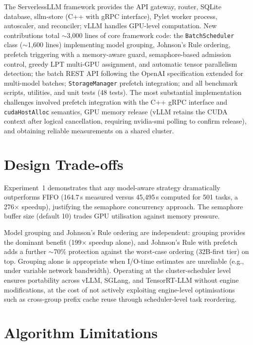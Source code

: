 \documentclass[logo,bsc,singlespacing,parskip,online]{infthesis}
\begin{document}
The ServerlessLLM framework provides the API gateway, router, SQLite database, sllm-store (C++ with gRPC interface), Pylet worker process, autoscaler, and reconciler; vLLM handles GPU-level computation. New contributions total $\sim$3{,}000 lines of core framework code: the \texttt{BatchScheduler} class ($\sim$1{,}600 lines) implementing model grouping, Johnson's Rule ordering, prefetch triggering with a memory-aware guard, semaphore-based admission control, greedy LPT multi-GPU assignment, and automatic tensor parallelism detection; the batch REST API following the OpenAI specification extended for multi-model batches; \texttt{StorageManager} prefetch integration; and all benchmark scripts, utilities, and unit tests (48 tests). The most substantial implementation challenges involved prefetch integration with the C++ gRPC interface and \texttt{cudaHostAlloc} semantics, GPU memory release (vLLM retains the CUDA context after logical cancellation, requiring nvidia-smi polling to confirm release), and obtaining reliable measurements on a shared cluster.

\section{Design Trade-offs}

Experiment~1 demonstrates that any model-aware strategy dramatically outperforms FIFO (164.7\,s measured versus 45{,}495\,s computed for 501 tasks, a 276$\times$ speedup), justifying the semaphore concurrency approach. The semaphore buffer size (default 10) trades GPU utilisation against memory pressure.

Model grouping and Johnson's Rule ordering are independent: grouping provides the dominant benefit (199$\times$ speedup alone), and Johnson's Rule with prefetch adds a further $\sim$70\% protection against the worst-case ordering (32B-first tier) on top. Grouping alone is appropriate when I/O-time estimates are unreliable (e.g., under variable network bandwidth). Operating at the cluster-scheduler level ensures portability across vLLM, SGLang, and TensorRT-LLM without engine modifications, at the cost of not actively exploiting engine-level optimisations such as cross-group prefix cache reuse through scheduler-level task reordering.

\section{Algorithm Limitations}
\end{document}
